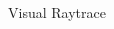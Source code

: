 \documentclass[final,hyperref={pdfpagelabels=false}]{beamer}
\begin{document}
\begin{frame}[t]
\begin{columns}[t]
\begin{column}{.96\textwidth}
\begin{block}{Visual Raytrace}
    
\end{block}

\end{column}

\begin{column}{.025\textwidth}\end{column} %

\end{columns} %



\begin{columns}[t] %

\begin{column}{.025\textwidth}\end{column} %

\begin{column}{.465\textwidth} %



\end{column}
\end{columns}
\end{frame}
\end{document}
